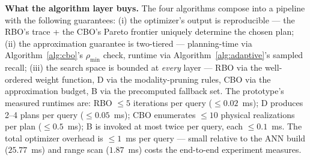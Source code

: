 \documentclass[sigconf,nonacm,review]{acmart}
\theoremstyle{plain}
\theoremstyle{definition}
\theoremstyle{remark}
\begin{document}
\noindent\textbf{What the algorithm layer buys.}
The four algorithms compose into a pipeline with the
following guarantees: (i) the optimizer's output is
reproducible --- the RBO's trace + the CBO's Pareto frontier
uniquely determine the chosen plan; (ii) the approximation
guarantee is two-tiered --- planning-time via
Algorithm~\ref{alg:cbo}'s $\rho_{\min}$ check, runtime via
Algorithm~\ref{alg:adaptive}'s sampled recall; (iii) the
search space is bounded at \emph{every} layer --- RBO via
the well-ordered weight function, D via the modality-pruning
rules, CBO via the approximation budget, B via the
precomputed fallback set. The prototype's measured runtimes
are: RBO $\le 5$ iterations per query ($\le 0.02$~ms); D
produces 2--4 plans per query ($\le 0.05$~ms); CBO
enumerates $\le 10$ physical realizations per plan
($\le 0.5$~ms); B is invoked at most twice per query, each
$\le 0.1$~ms. The total optimizer overhead is $\le 1$~ms
per query --- small relative to the ANN build
($25.77$~ms) and range scan ($1.87$~ms) costs the
end-to-end experiment measures.
\end{document}
